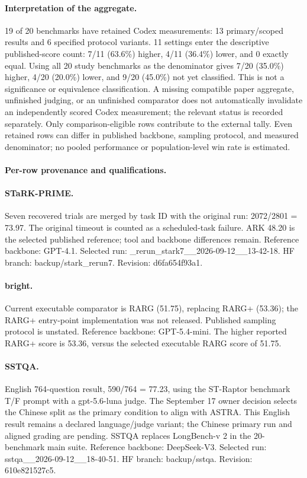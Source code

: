 \paragraph{Interpretation of the aggregate.}
19 of 20 benchmarks have retained Codex measurements: 13 primary/scoped results and 6 specified protocol variants.
11 settings enter the descriptive published-score count: 7/11 (63.6\%) higher, 4/11 (36.4\%) lower, and 0 exactly equal.
Using all 20 study benchmarks as the denominator gives 7/20 (35.0\%) higher, 4/20 (20.0\%) lower, and 9/20 (45.0\%) not yet classified.
This is not a significance or equivalence classification. A missing compatible paper
aggregate, unfinished judging, or an unfinished comparator does not automatically
invalidate an independently scored Codex measurement; the relevant status is recorded
separately. Only comparison-eligible rows contribute to the external tally.
Even retained rows can differ in published backbone, sampling protocol, and measured
denominator; no pooled performance or population-level win rate is estimated.

\paragraph{Per-row provenance and qualifications.}
\paragraph{STaRK-PRIME.} Seven recovered trials are merged by task ID with the original run: 2072/2801 = 73.97. The original timeout is counted as a scheduled-task failure. ARK 48.20 is the selected published reference; tool and backbone differences remain. Reference backbone: GPT-4.1. Selected run: \_rerun\_stark7\_\_2026-09-12\_\_13-42-18. HF branch: backup/stark\_rerun7. Revision: d6fa654f93a1.
\paragraph{bright.} Current executable comparator is RARG (51.75), replacing RARG+ (53.36); the RARG+ entry-point implementation was not released. Published sampling protocol is unstated. Reference backbone: GPT-5.4-mini. The higher reported RARG+ score is 53.36, versus the selected executable RARG score of 51.75.
\paragraph{SSTQA.} English 764-question result, 590/764 = 77.23, using the ST-Raptor benchmark T/F prompt with a gpt-5.6-luna judge. The September 17 owner decision selects the Chinese split as the primary condition to align with ASTRA. This English result remains a declared language/judge variant; the Chinese primary run and aligned grading are pending. SSTQA replaces LongBench-v 2 in the 20-benchmark main suite. Reference backbone: DeepSeek-V3. Selected run: sstqa\_\_2026-09-12\_\_18-40-51. HF branch: backup/sstqa. Revision: 610e821527c5.
